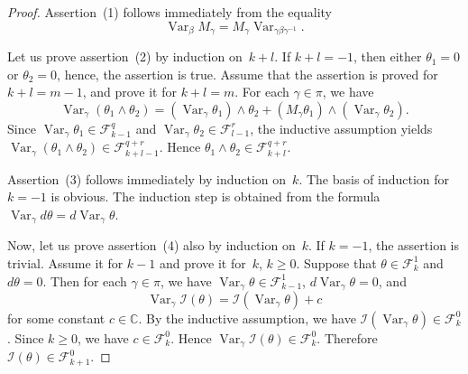 \documentclass[reqno,tbtags,12pt]{amsart}
\numberwithin{equation}{section}
\newcommand{\C}{\mathbb{C}}
\newcommand{\CF}{\mathcal{F}}
\newcommand{\I}{\mathcal{I}}
\newcommand{\Var}{\mathop{\mathrm{Var}}\nolimits}
\theoremstyle{definition}
\begin{document}
\begin{proof}
Assertion~(1)  follows immediately from the equality $$\Var_{\beta}M_{\gamma}=M_{\gamma}\Var_{\gamma\beta\gamma^{-1}}.$$ 


Let us prove assertion~(2) by induction on~$k+l$. If $k+l=-1$, then either $\theta_1=0$ or $\theta_2=0$, hence, the assertion is true. Assume that the assertion is proved for $k+l=m-1$, and prove it for $k+l=m$. For each $\gamma\in\pi$, we have
$$
\Var_{\gamma}(\theta_1\wedge\theta_2)=
(\Var_{\gamma}\theta_1)\wedge\theta_2+(M_{\gamma}\theta_1)\wedge(\Var_{\gamma}\theta_2).
$$
Since $\Var_{\gamma}\theta_1\in\CF_{k-1}^q$ and $\Var_{\gamma}\theta_2\in\CF_{l-1}^r$, the inductive assumption yields $\Var_{\gamma}(\theta_1\wedge\theta_2)\in\CF_{k+l-1}^{q+r}$. Hence $\theta_1\wedge\theta_2\in\CF^{q+r}_{k+l}$.




Assertion~(3) follows immediately by induction on~$k$. The basis of induction for $k=-1$ is obvious. The induction step is obtained from the  formula $\Var_{\gamma}d\theta=d\Var_{\gamma}\theta$. 

Now, let us prove assertion~(4) also by induction on~$k$. If $k=-1$, the assertion is trivial. Assume it for $k-1$ and prove it for~$k$, $k\ge 0$. Suppose that  $\theta\in\CF_k^{1}$ and $d\theta=0$. Then for each $\gamma\in\pi$, we have $\Var_{\gamma}\theta\in\CF_{k-1}^1$, $d\Var_{\gamma}\theta=0$,  and
$$
\Var_{\gamma}\I(\theta)=\I(\Var_{\gamma}\theta)+c
$$
for some constant $c\in\C$. By the inductive assumption, we have $\I(\Var_{\gamma}\theta)\in\CF_k^0$. Since $k\ge 0$, we have $c\in\CF_k^0$. Hence  $\Var_{\gamma}\I(\theta)\in\CF_k^0$. Therefore $\I(\theta)\in\CF_{k+1}^0$. 
\end{proof} 
\end{document}

